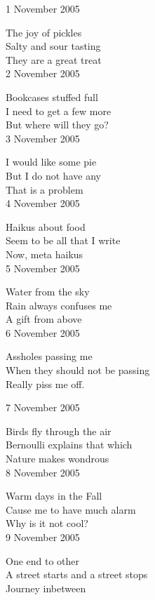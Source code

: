 \documentclass[12pt]{article}
\begin{document}
\setlength{\parskip}{1mm}

\newpage

1 November 2005

The joy of pickles \\
Salty and sour tasting  \\
They are a great treat \\

2 November 2005

Bookcases stuffed full \\
I need to get a few more \\
But where will they go? \\

3 November 2005

I would like some pie \\
But I do not have any \\
That is a problem \\

4 November 2005

Haikus about food \\
Seem to be all that I write \\
Now, meta haikus \\

5 November 2005

Water from the sky \\
Rain always confuses me \\
A gift from above \\

6 November 2005

Assholes passing me \\
When they should not be passing \\
Really piss me off. \\


\newpage

7 November 2005

Birds fly through the air \\
Bernoulli explains that which \\
Nature makes wondrous \\

8 November 2005

Warm days in the Fall \\
Cause me to have much alarm \\
Why is it not cool? \\

9 November 2005

One end to other \\
A street starts and a street stops \\
Journey inbetween \\
\end{document}
